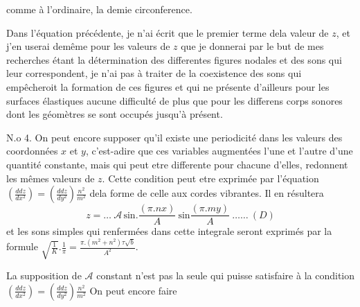 \documentclass[11pt,a4paper]{article}
\begin{document}
comme à l'ordinaire, la demie circonference.

Dans l'équation précédente, je n'ai écrit que le premier
terme dela valeur de $z$, et j'en userai demême pour  les valeurs
de $z$ que je donnerai par   le but de mes recherches
étant la détermination des differentes figures nodales et des
sons qui leur correspondent, je n'ai pas à traiter de
la coexistence des sons qui empêcheroit la formation
de ces figures et qui ne présente d'ailleurs pour les
surfaces élastiques aucune difficulté de plus que pour les
differens corps sonores dont les géomètres se sont occupés
jusqu'à présent.

N.o 4. On peut encore supposer qu'il existe une periodicité
dans les valeurs des coordonnées $x$ et $y$, c'est-adire que ces
variables augmentées l'une et l'autre d'une quantité
constante, mais qui peut etre differente pour chacune d'elles,
redonnent les mêmes valeurs de $z$. Cette condition peut
etre exprimée par l'équation $\left(\frac{ddz}{dx^2}\right) = \left(\frac{ddz}{dy^2}\right)\frac{n^2}{m^2}$ dela
forme de celle aux cordes vibrantes. Il en résultera
\[ z = \ldots\ \mathcal{A}\,\text{sin.}\frac{(\pi.nx)}{A}\ \text{sin}\frac{(\pi.my)}{A}\ \ldots\ldots\ (D) \]
et les sons simples qui   renfermées dans cette integrale
seront exprimés par la formule $\sqrt{\tfrac{1}{K}}.\frac{1}{\pi} = \frac{\pi.(m^2+n^2)\tau\sqrt{b}}{A^2}$.

La supposition de $\mathcal{A}$ constant n'est pas la seule
qui puisse satisfaire à la condition $\left(\frac{ddz}{dx^2}\right) = \left(\frac{ddz}{dy^2}\right)\frac{n^2}{m^2}$
On peut encore faire
\end{document}
